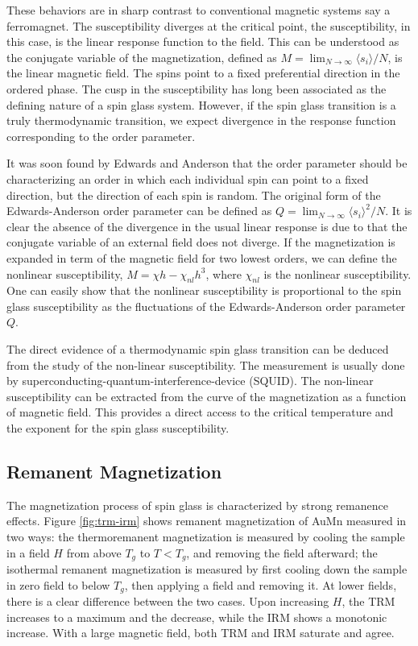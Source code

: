 These behaviors are in sharp contrast to conventional magnetic systems say a ferromagnet. 
The susceptibility diverges at the critical point, the susceptibility,
in this case, is the linear response function to the field. This can be understood 
as the conjugate variable of the magnetization, defined as 
$M=\lim_{N \rightarrow \infty} \langle s_{i}\rangle / N$, 
is the linear magnetic field. 
The spins point to a fixed preferential direction in the ordered phase. 
The cusp in the susceptibility has long been associated as the defining nature 
of a spin glass system. However, if the spin glass transition is a truly 
thermodynamic transition, we expect divergence in the response function
corresponding to the order parameter. 

It was soon found by Edwards and Anderson that the order parameter should be 
characterizing an order in which each individual spin can point to a fixed 
direction, but the direction of each spin is random. The original form of the 
Edwards-Anderson order parameter can be defined as 
$Q=\lim_{N \rightarrow \infty} \langle s_{i}\rangle^{2} / N$. 
It is clear the absence 
of the divergence in the usual linear response is due to that the conjugate 
variable of an external field does not diverge. If the magnetization is expanded 
in term of the magnetic field for two lowest orders, we can define
the nonlinear susceptibility, $M=\chi h - \chi_{nl} h^{3}$, where $\chi_{nl}$ is 
the nonlinear susceptibility. 
One can easily show that the nonlinear susceptibility is proportional to the 
spin glass susceptibility as the fluctuations of the Edwards-Anderson order 
parameter $Q$. 

The direct evidence of a thermodynamic spin glass transition can be deduced from 
the study of the non-linear susceptibility. The measurement is usually done by 
superconducting-quantum-interference-device (SQUID). The non-linear susceptibility 
can be extracted from the curve of the magnetization as a function of magnetic field.
This provides a direct access to the critical temperature and the exponent for the 
spin glass susceptibility. 


\subsection{Remanent Magnetization}
The magnetization process of spin glass is characterized by strong remanence effects.
Figure \ref{fig:trm-irm} shows remanent magnetization of AuMn measured in two ways:
the thermoremanent magnetization is measured by cooling the sample in a field $H$ 
from above $T_g$ to $T<T_g$, and removing the field afterward; the isothermal 
remanent magnetization is measured by first cooling down the sample in zero field to
below $T_g$, then applying a field and removing it. At lower fields, there is a 
clear difference between the two cases. Upon increasing $H$, the TRM increases to 
a maximum and the decrease, while the IRM shows a monotonic increase. With a large
magnetic field, both TRM and IRM saturate and agree. 


